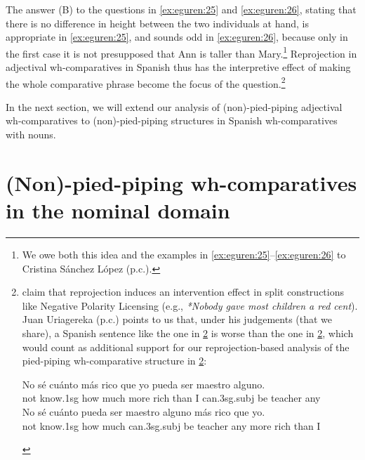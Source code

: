 \documentclass[output=paper,colorlinks,citecolor=brown]{langscibook}
\begin{document}
The answer (B) to the questions in \ref{ex:eguren:25} and \ref{ex:eguren:26}, stating that there is no difference in height between the two individuals at hand, is appropriate in \ref{ex:eguren:25}, and sounds odd in \ref{ex:eguren:26}, because only in the first case it is not presupposed that Ann is taller than Mary.\footnote{We owe both this idea and the examples in \ref{ex:eguren:25}--\ref{ex:eguren:26} to Cristina Sánchez López (p.c.).} Reprojection in adjectival wh-comparatives in Spanish thus has the interpretive effect of making the whole comparative phrase become the focus of the question.\footnote{\cite[110]{hornstein2002reprojections} claim that reprojection induces an intervention effect in split constructions like Negative Polarity Licensing (e.g., \textit{*Nobody gave most children a red cent}). Juan Uriagereka (p.c.) points to us that, under his judgements (that we share), a Spanish sentence like the one in \ref{ex:eguren:fn2a} is worse than the one in \ref{ex:eguren:fn2b}, which would count as additional support for our reprojection-based analysis of the pied-piping wh-comparative structure in \ref{ex:eguren:fn2a}:
\begin{exe}
      \ex\label{ex:eguren:fn2}
       \begin{xlist} %
        \ex\label{ex:eguren:fn2a} %
            \gll   No sé cuánto 		más	rico	que	yo	pueda	ser	maestro	alguno.\\   %
           	not know.1sg {how much} 	more	rich	than	I	can.3sg.subj	be	teacher	any\\
            \ex\label{ex:eguren:fn2b}
            \gll No	sé 	cuánto	pueda			ser	maestro	alguno		más	rico	que	yo.\\
            not know.1sg	{how much}		can.3sg.subj	be	teacher	any		more	rich	than	I\\
\end{xlist}
 \end{exe}
}

In the next section, we will extend our analysis of (non)-pied-piping adjectival wh-comparatives to (non)-pied-piping structures in Spanish wh-comparatives with nouns. 

\section{(Non)-pied-piping wh-comparatives in the nominal domain}
\label{sec:eguren:5}
\end{document}
